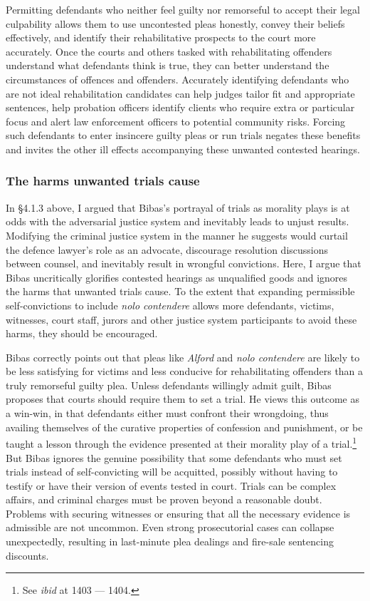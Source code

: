 Permitting defendants who neither feel guilty nor remorseful to accept their legal culpability allows them to use uncontested pleas honestly, convey their beliefs effectively, and identify their rehabilitative prospects to the court more accurately. Once the courts and others tasked with rehabilitating offenders understand what defendants think is true, they can better understand the circumstances of offences and offenders. Accurately identifying defendants who are not ideal rehabilitation candidates can help judges tailor fit and appropriate sentences, help probation officers identify clients who require extra or particular focus and alert law enforcement officers to potential community risks. Forcing such defendants to enter insincere guilty pleas or run trials negates these benefits and invites the other ill effects accompanying these unwanted contested hearings.

\subsubsection{The harms unwanted trials cause}

In \S 4.1.3 above, I argued that Bibas's portrayal of trials as morality plays is at odds with the adversarial justice system and inevitably leads to unjust results. Modifying the criminal justice system in the manner he suggests would curtail the defence lawyer's role as an advocate, discourage resolution discussions between counsel, and inevitably result in wrongful convictions. Here, I argue that Bibas uncritically glorifies contested hearings as unqualified goods and ignores the harms that unwanted trials cause. To the extent that expanding permissible self-convictions to include \textit{nolo contendere} allows more defendants, victims, witnesses, court staff, jurors and other justice system participants to avoid these harms, they should be encouraged.

Bibas correctly points out that pleas like \textit{Alford} and \textit{nolo contendere} are likely to be less satisfying for victims and less conducive for rehabilitating offenders than a truly remorseful guilty plea. Unless defendants willingly admit guilt, Bibas proposes that courts should require them to set a trial. He views this outcome as a win-win, in that defendants either must confront their wrongdoing, thus availing themselves of the curative properties of confession and punishment, or be taught a lesson through the evidence presented at their morality play of a trial.\footnote{See \textit{ibid} at 1403 — 1404.} But Bibas ignores the genuine possibility that some defendants who must set trials instead of self-convicting will be acquitted, possibly without having to testify or have their version of events tested in court. Trials can be complex affairs, and criminal charges must be proven beyond a reasonable doubt. Problems with securing witnesses or ensuring that all the necessary evidence is admissible are not uncommon. Even strong prosecutorial cases can collapse unexpectedly, resulting in last-minute plea dealings and fire-sale sentencing discounts. 

